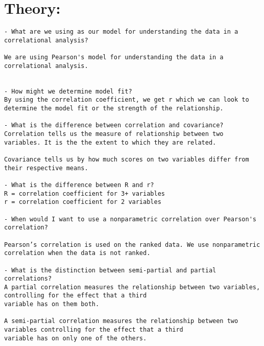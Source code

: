 \documentclass[
]{article}
\begin{document}
\hypertarget{theory}{%
\section{Theory:}\label{theory}}

\begin{verbatim}
- What are we using as our model for understanding the data in a correlational analysis?

We are using Pearson's model for understanding the data in a correlational analysis.


- How might we determine model fit?
By using the correlation coefficient, we get r which we can look to determine the model fit or the strength of the relationship.

- What is the difference between correlation and covariance?
Correlation tells us the measure of relationship between two variables. It is the the extent to which they are related.

Covariance tells us by how much scores on two variables differ from their respective means.

- What is the difference between R and r?
R = correlation coefficient for 3+ variables
r = correlation coefficient for 2 variables

- When would I want to use a nonparametric correlation over Pearson's correlation?

Pearson’s correlation is used on the ranked data. We use nonparametric correlation when the data is not ranked.

- What is the distinction between semi-partial and partial correlations? 
A partial correlation measures the relationship between two variables, controlling for the effect that a third
variable has on them both.

A semi-partial correlation measures the relationship between two variables controlling for the effect that a third
variable has on only one of the others.
\end{verbatim}
\end{document}
